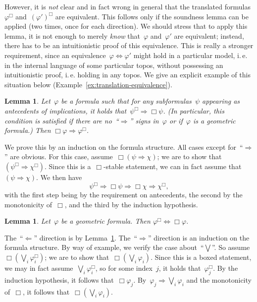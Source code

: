 \documentclass[10pt,reqno,a4paper]{amsbook}
\makeatletter
\theoremstyle{definition}
\theoremstyle{plain}
\newtheorem{lemma}[defn]{Lemma}
\theoremstyle{remark}
\newcommand{\?}{\,{:}\,}
\renewcommand{\_}{\mathpunct{.}\,}
\newcommand{\ie}{i.\,e.\@\xspace}
\renewenvironment{proof}[1][\proofname]{\par
  \pushQED{\qed}%
  \normalfont \topsep6\p@\@plus6\p@\relax
  \trivlist
  \item[\hskip\labelsep
        \itshape
    #1\@addpunct{.}]\ignorespaces
}{%
  \popQED\endtrivlist\@endpefalse
}
\makeatother
\begin{document}
However, it is \emph{not} clear and in fact wrong in general that the translated formulas~$\varphi^\Box$
and~$(\varphi')^\Box$ are equivalent. This follows only if the soundness
lemma can be applied (two times, once for each direction). We should stress that to apply this
lemma, it is not enough to merely \emph{know} that~$\varphi$ and~$\varphi'$ are
equivalent; instead, there has to be an intuitionistic proof of this
equivalence. This is really a stronger requirement, since an
equivalence~$\varphi \Leftrightarrow \varphi'$ might
hold in a particular model, \ie in the internal language of some particular
topos, without possessing an intuitionistic proof, \ie holding in any topos. We
give an explicit example of this situation below
(Example~\ref{ex:translation-equivalence}).

\begin{lemma}\label{lemma:open-stalk}
Let~$\varphi$ be a formula such that for any subformulas~$\psi$
appearing as antecedents of implications, it holds that~$\psi^\Box \Rightarrow
\Box\psi$. (In particular, this condition is satisfied if there are
no~``$\Rightarrow$'' signs in~$\varphi$ or if~$\varphi$ is a geometric formula.) Then $\Box\varphi \Rightarrow
\varphi^\Box$.\end{lemma}
\begin{proof}We prove this by an induction on the formula structure. All cases
except for~``$\Rightarrow$'' are obvious. For this case, assume~$\Box(\psi
\Rightarrow \chi)$; we are to show that~$(\psi^\Box \Rightarrow \chi^\Box)$.
Since this is a~$\Box$-stable statement, we can in fact assume that~$(\psi
\Rightarrow \chi)$. We then have
\[ \psi^\Box \Longrightarrow \Box\psi \Longrightarrow \Box\chi
\Longrightarrow \chi^\Box, \]
with the first step being by the requirement on antecedents, the second by the
monotonicity of~$\Box$, and the third by the induction hypothesis.
\end{proof}

\begin{lemma}\label{lemma:stalk-open}
Let~$\varphi$ be a geometric formula.
Then $\varphi^\Box \Leftrightarrow \Box\varphi$.\end{lemma}
\begin{proof}The~``$\Leftarrow$'' direction is by Lemma~\ref{lemma:open-stalk}.
The~``$\Rightarrow$'' direction is an induction on the formula structure. By way of example, we verify
the case about~``$\bigvee$''. So assume~$\Box(\bigvee_i \varphi_i^\Box)$; we are
to show that~$\Box(\bigvee_i \varphi_i)$. Since this is a boxed statement, we
may in fact assume~$\bigvee_i \varphi_i^\Box$, so for some index~$j$, it holds
that~$\varphi_j^\Box$. By the induction hypothesis, it follows
that~$\Box\varphi_j$. By~$\varphi_j \Rightarrow \bigvee_i \varphi_i$ and the
monotonicity of~$\Box$, it follows that~$\Box(\bigvee_i \varphi_i)$.
\end{proof}
\end{document}
